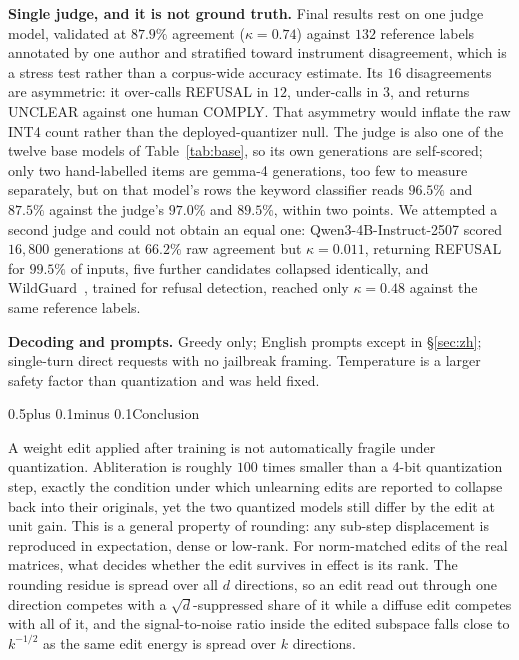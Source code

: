 \documentclass[conference,compsoc,letterpaper]{IEEEtran}
\makeatletter
\def\section{\@startsection{section}{1}{\z@}{1\baselineskip plus 0.25\baselineskip minus 0.25\baselineskip}%
{0.5\baselineskip plus 0.1\baselineskip minus 0.1\baselineskip}{\normalfont\large\bfseries}}%
\makeatother
\begin{document}
\textbf{Single judge, and it is not ground truth.} Final results rest on one judge model, validated at $87.9\%$ agreement ($\kappa = 0.74$) against $132$ reference labels annotated by one author and stratified toward instrument disagreement, which is a stress test rather than a corpus-wide accuracy estimate. Its $16$ disagreements are asymmetric: it over-calls REFUSAL in $12$, under-calls in $3$, and returns UNCLEAR against one human COMPLY. That asymmetry would inflate the raw INT4 count rather than the deployed-quantizer null. The judge is also one of the twelve base models of Table~\ref{tab:base}, so its own generations are self-scored; only two hand-labelled items are gemma-4 generations, too few to measure separately, but on that model's rows the keyword classifier reads $96.5\%$ and $87.5\%$ against the judge's $97.0\%$ and $89.5\%$, within two points. We attempted a second judge and could not obtain an equal one: Qwen3-4B-Instruct-2507 scored $16{,}800$ generations at $66.2\%$ raw agreement but $\kappa = 0.011$, returning REFUSAL for $99.5\%$ of inputs, five further candidates collapsed identically, and WildGuard~\cite{han2024wildguard}, trained for refusal detection, reached only $\kappa = 0.48$ against the same reference labels.

\textbf{Decoding and prompts.} Greedy only; English prompts except in \S\ref{sec:zh}; single-turn direct requests with no jailbreak framing. Temperature is a larger safety factor than quantization and was held fixed.

\section{Conclusion}

A weight edit applied after training is not automatically fragile under quantization. Abliteration is roughly $100$ times smaller than a 4-bit quantization step, exactly the condition under which unlearning edits are reported to collapse back into their originals, yet the two quantized models still differ by the edit at unit gain. This is a general property of rounding: any sub-step displacement is reproduced in expectation, dense or low-rank. For norm-matched edits of the real matrices, what decides whether the edit survives in effect is its rank. The rounding residue is spread over all $d$ directions, so an edit read out through one direction competes with a $\sqrt{d}$-suppressed share of it while a diffuse edit competes with all of it, and the signal-to-noise ratio inside the edited subspace falls close to $k^{-1/2}$ as the same edit energy is spread over $k$ directions.
\end{document}
